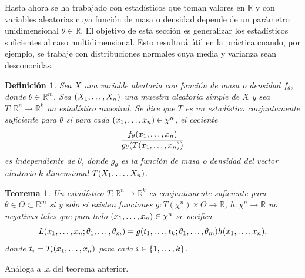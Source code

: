 \documentclass[11pt]{report}
\makeatletter
\renewenvironment{proof}[1][\proofname]{\par
  \pushQED{\qed}%
  \normalfont \topsep\z@skip %
  \trivlist
  \item[\hskip\labelsep
        \itshape
    #1\@addpunct{.}]\ignorespaces
}{%
  \popQED\endtrivlist\@endpefalse
}
\newtheorem{theorem}{Teorema}
\newtheorem{definition}{Definición}
\theoremstyle{definition}
\newcommand{\R}{\mathbb R}
\makeatother
\begin{document}
Hasta ahora se ha trabajado con estadísticos que toman valores en $\R$ y con variables aleatorias cuya función de masa o densidad depende de un parámetro unidimensional $\theta \in \R$. El objetivo de esta sección es generalizar los estadísticos suficientes al caso multidimensional. Esto resultará útil en la práctica cuando, por ejemplo, se trabaje con distribuciones normales cuya media y varianza sean desconocidas.

\begin{definition}
Sea $X$ una variable aleatoria con función de masa o densidad $f_\theta$, donde $\theta \in \R^m$. Sea $(X_1,\mathellipsis,X_n)$ una muestra aleatoria simple de $X$ y sea $T\colon \R^n \to \R^k$ un estadístico muestral. Se dice que $T$ es un \emph{estadístico conjuntamente suficiente para $\theta$} si para cada $(x_1,\mathellipsis,x_n) \in \chi^n$, el cociente
\[\frac{f_\theta(x_1,\mathellipsis,x_n)}{g_\theta(T(x_1,\mathellipsis,x_n))} \]
es independiente de $\theta$, donde $g_\theta$ es la función de masa o densidad del vector aleatorio $k$-dimensional $T(X_1,\mathellipsis,X_n)$.
\end{definition}

\begin{theorem}
Un estadístico $T \colon \R^n \to \R^k$ es conjuntamente suficiente para $\theta \in \Theta \subset \R^m$ si y solo si existen funciones $g \colon T(\chi^n) \times \Theta \to \R$, $h \colon \chi^n \to \R$ no negativas tales que para todo $(x_1,\mathellipsis,x_n) \in \chi^n$ se verifica
\[L(x_1,\mathellipsis,x_n;\theta_1,\mathellipsis,\theta_m) = g(t_1,\mathellipsis,t_k;\theta_1,\mathellipsis,\theta_m)h(x_1,\mathellipsis,x_n),\]
donde $t_i = T_i(x_1,\mathellipsis,x_n)$ para cada $i \in \{1,\mathellipsis,k\}$.
\end{theorem}

\begin{proof}
    Análoga a la del teorema anterior.
\end{proof}
\end{document}
